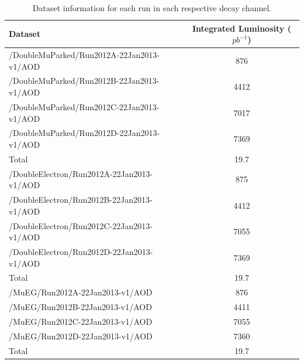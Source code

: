 \begin{table} 
\begin{center}
\begin{tabular}{|l|c|}
\hline
	\textbf{Dataset} & \textbf{Integrated Luminosity ($pb^{-1}$)}\\
\hline
	/DoubleMuParked/Run2012A-22Jan2013-v1/AOD  & 876 \\
	/DoubleMuParked/Run2012B-22Jan2013-v1/AOD  & 4412 \\
	/DoubleMuParked/Run2012C-22Jan2013-v1/AOD  & 7017 \\
	/DoubleMuParked/Run2012D-22Jan2013-v1/AOD  & 7369 \\
\hline
	Total & 19.7\\	
\hline
	/DoubleElectron/Run2012A-22Jan2013-v1/AOD  & 875 \\
	/DoubleElectron/Run2012B-22Jan2013-v1/AOD  & 4412 \\
	/DoubleElectron/Run2012C-22Jan2013-v1/AOD  & 7055 \\
	/DoubleElectron/Run2012D-22Jan2013-v1/AOD  & 7369 \\
\hline
	Total & 19.7\\	
\hline
	/MuEG/Run2012A-22Jan2013-v1/AOD  & 876 \\
	/MuEG/Run2012B-22Jan2013-v1/AOD  & 4411 \\
	/MuEG/Run2012C-22Jan2013-v1/AOD  & 7055 \\
	/MuEG/Run2012D-22Jan2013-v1/AOD  & 7360 \\
\hline
	Total & 19.7\\	
\hline	
\end{tabular}	
\end{center}
\caption{Dataset information for each run in each respective decay channel.}
\label{tab-datasets}
\end{table}

